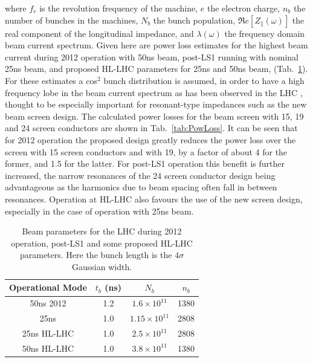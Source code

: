 \documentclass{JAC2003}
\begin{document}
where $f_{r}$ is the revolution frequency of the machine, $e$ the electron charge, $n_{b}$ the number of bunches in the machines, $N_{b}$ the bunch population, $\Re{}e[Z_{\parallel}(\omega )]$ the real component of the longitudinal impedance, and $\lambda (\omega )$ the frequency domain beam current spectrum. Given here are power loss estimates for the highest beam current during 2012 operation with 50ns beam, post-LS1 running with nominal 25ns beam, and proposed HL-LHC parameters for 25ns and 50ns beam, (Tab.~\ref{tab:BrenHLPara}). For these estimates a cos$^{2}$ bunch distribution is assumed, in order to have a high frequency lobe in the beam current spectrum as has been observed in the LHC \cite{LHCRF}, thought to be especially important for resonant-type impedances such as the new beam screen design. The calculated power losses for the beam screen with 15, 19 and 24 screen conductors are shown in Tab.~\ref{tab:PowLoss}. It can be seen that for 2012 operation the proposed design greatly reduces the power loss over the screen with 15 screen conductors and with 19, by a factor of about 4 for the former, and 1.5 for the latter. For post-LS1 operation this benefit is further increased, the narrow resonances of the 24 screen conductor design being advantageous as the harmonics due to beam spacing often fall in between resonances. Operation at HL-LHC also favours the use of the new screen design, especially in the case of operation with 25ns beam.

\begin{table}
\caption{Beam parameters for the LHC during 2012 operation, post-LS1 and some proposed HL-LHC parameters. Here the bunch length is the $4\sigma$ Gaussian width.}
\label{tab:BrenHLPara}
\begin{center}
\begin{tabular}{c | c | c | c }
Operational Mode & $t_{b}$ (ns) & $N_{b}$ & $n_{b}$ \\ \hline
50ns 2012 & 1.2 & $1.6 \times 10^{11}$ & 1380 \\ \hline
25ns & 1.0 & $1.15 \times 10^{11}$ & 2808 \\ \hline
25ns HL-LHC & 1.0 &  $2.5 \times 10^{11}$ & 2808 \\ \hline
50ns HL-LHC & 1.0 &  $3.8 \times 10^{11}$ & 1380 \\ 
\end{tabular}
\end{center}
\end{table}
\end{document}
